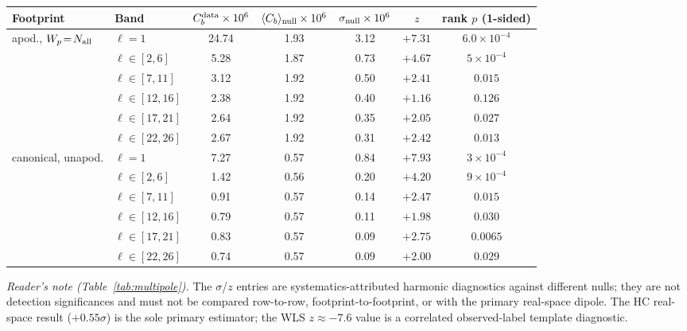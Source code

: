 \documentclass[aps,prd,twocolumn,superscriptaddress,preprintnumbers,nofootinbib,longbibliography,floatfix]{revtex4-2}
\newcommand{\sigmaunit}{\sigma}
\begin{document}
\begin{table}[tbp]
\begin{ruledtabular}
\begin{tabular}{llccccc}
\textbf{Footprint} & \textbf{Band} & \textbf{$C_b^{\rm data} \times 10^{6}$} &
\textbf{$\langle C_b\rangle_{\rm null} \times 10^{6}$} &
\textbf{$\sigma_{\rm null} \times 10^{6}$} &
\textbf{$z$} & \textbf{rank $p$ (1-sided)} \\
\hline
apod., $W_p\!=\!N_{\rm all}$ & $\ell\!=\!1$ & 24.74 & 1.93 & 3.12 & $+7.31$ & $6.0\times10^{-4}$ \\
 & $\ell\!\in\![2,6]$ & 5.28 & 1.87 & 0.73 & $+4.67$ & $5\times10^{-4}$ \\
 & $\ell\!\in\![7,11]$ & 3.12 & 1.92 & 0.50 & $+2.41$ & $0.015$ \\
 & $\ell\!\in\![12,16]$ & 2.38 & 1.92 & 0.40 & $+1.16$ & $0.126$ \\
 & $\ell\!\in\![17,21]$ & 2.64 & 1.92 & 0.35 & $+2.05$ & $0.027$ \\
 & $\ell\!\in\![22,26]$ & 2.67 & 1.92 & 0.31 & $+2.42$ & $0.013$ \\
\hline
canonical, unapod. & $\ell\!=\!1$ & 7.27 & 0.57 & 0.84 & $+7.93$ & $3\times10^{-4}$ \\
 & $\ell\!\in\![2,6]$ & 1.42 & 0.56 & 0.20 & $+4.20$ & $9\times10^{-4}$ \\
 & $\ell\!\in\![7,11]$ & 0.91 & 0.57 & 0.14 & $+2.47$ & $0.015$ \\
 & $\ell\!\in\![12,16]$ & 0.79 & 0.57 & 0.11 & $+1.98$ & $0.030$ \\
 & $\ell\!\in\![17,21]$ & 0.83 & 0.57 & 0.09 & $+2.75$ & $0.0065$ \\
 & $\ell\!\in\![22,26]$ & 0.74 & 0.57 & 0.09 & $+2.00$ & $0.029$ \\
\end{tabular}
\end{ruledtabular}
\end{table}

\noindent\emph{Reader's note (Table~\ref{tab:multipole}).} The $\sigma$/$z$ entries are systematics-attributed harmonic diagnostics against different nulls; they are not detection significances and must not be compared row-to-row, footprint-to-footprint, or with the primary real-space dipole. The HC real-space result ($+0.55\sigmaunit$) is the sole primary estimator; the WLS $z\approx-7.6$ value is a correlated observed-label template diagnostic.
\end{document}
